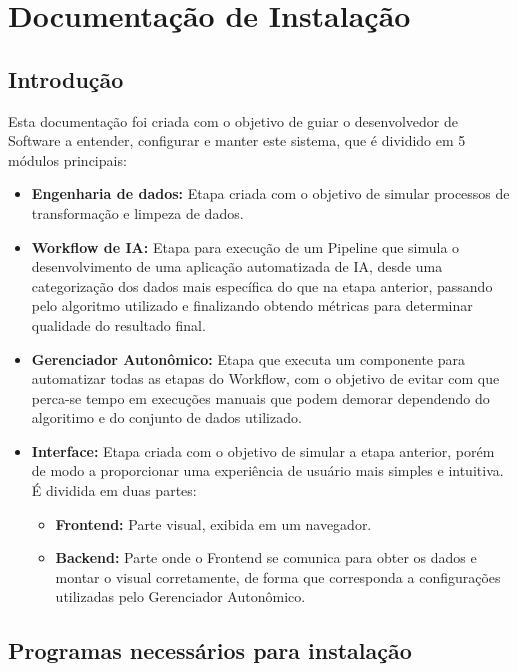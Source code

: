 \documentclass[Portugues,Final]{ic-tese-v3}
\begin{document}



\appendix
\chapter{Documentação de Instalação}
\label{ann:DocInstall}

\section{Introdução}

Esta documentação foi criada com o objetivo de guiar o desenvolvedor de Software a entender, configurar e manter este sistema, que é dividido em 5 módulos principais:

\begin{itemize}
    \item {\textbf{Engenharia de dados:}} Etapa criada com o objetivo de simular processos de transformação e limpeza de dados.
    \item {\textbf{Workflow de IA:}} Etapa para execução de um Pipeline que simula o desenvolvimento de uma aplicação automatizada de IA, desde uma categorização dos dados mais específica do que na etapa anterior, passando pelo algoritmo utilizado e finalizando obtendo métricas para determinar qualidade do resultado final.
    \item {\textbf{Gerenciador Autonômico:}} Etapa que executa um componente para automatizar todas as etapas do Workflow, com o objetivo de evitar com que perca-se tempo em execuções manuais que podem demorar dependendo do algoritimo e do conjunto de dados utilizado.
    \item {\textbf{Interface:}} Etapa criada com o objetivo de simular a etapa anterior, porém de modo a proporcionar uma experiência de usuário mais simples e intuitiva. É dividida em duas partes:
    \begin{itemize}
        \item {\textbf{Frontend:}} Parte visual, exibida em um navegador.
        \item \textbf{{Backend:}} Parte onde o Frontend se comunica para obter os dados e montar o visual corretamente, de forma que corresponda a configurações utilizadas pelo Gerenciador Autonômico.
    \end{itemize}
\end{itemize}

\section{Programas necessários para instalação}
\end{document}
